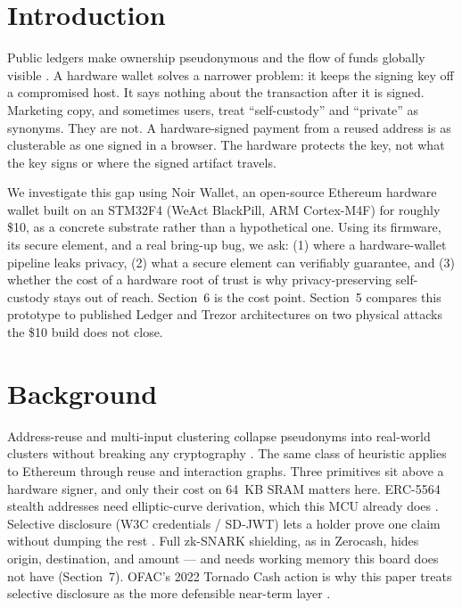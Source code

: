 \documentclass[10pt]{article}
\begin{document}
\section{Introduction}

Public ledgers make ownership pseudonymous and the flow of funds globally visible \cite{meiklejohn2013}. A hardware wallet solves a narrower problem: it keeps the signing key off a compromised host. It says nothing about the transaction after it is signed. Marketing copy, and sometimes users, treat ``self-custody'' and ``private'' as synonyms. They are not. A hardware-signed payment from a reused address is as clusterable as one signed in a browser. The hardware protects the key, not what the key signs or where the signed artifact travels.

We investigate this gap using Noir Wallet, an open-source Ethereum hardware wallet built on an STM32F4 (WeAct BlackPill, ARM Cortex-M4F) for roughly \$10, as a concrete substrate rather than a hypothetical one. Using its firmware, its secure element, and a real bring-up bug, we ask: (1) where a hardware-wallet pipeline leaks privacy, (2) what a secure element can verifiably guarantee, and (3) whether the cost of a hardware root of trust is why privacy-preserving self-custody stays out of reach. Section~6 is the cost point. Section~5 compares this prototype to published Ledger and Trezor architectures on two physical attacks the \$10 build does not close.

\section{Background}

Address-reuse and multi-input clustering collapse pseudonyms into real-world clusters without breaking any cryptography \cite{meiklejohn2013}. The same class of heuristic applies to Ethereum through reuse and interaction graphs. Three primitives sit above a hardware signer, and only their cost on 64~KB SRAM matters here. ERC-5564 stealth addresses need elliptic-curve derivation, which this MCU already does \cite{erc5564}. Selective disclosure (W3C credentials / SD-JWT) lets a holder prove one claim without dumping the rest \cite{sdjwt2025}. Full zk-SNARK shielding, as in Zerocash, hides origin, destination, and amount \cite{zerocash2014} --- and needs working memory this board does not have (Section~7). OFAC's 2022 Tornado Cash action is why this paper treats selective disclosure as the more defensible near-term layer \cite{ofac2022}.
\end{document}
